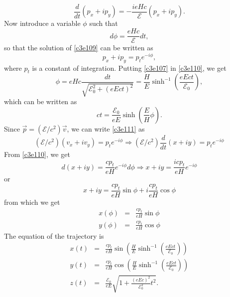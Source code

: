 \begin{enumerate}
\begin{equation}
\frac{d}{dt}(p_x + ip_y) = -\frac{ieHc}{\mathcal{E}}(p_x + ip_y).
\end{equation}
Now introduce a variable $\phi$ such that
\begin{equation}\label{c3e111}
d\phi = \frac{eHc}{\mathcal{E}}dt,
\end{equation}
so that the solution of \eqref{c3e109} can be written as
\begin{equation}\label{c3e112}
p_x + ip_y = p_t e^{-i\phi},
\end{equation}
where $p_t$ is a constant of integration. Putting \eqref{c3e107} in 
\eqref{c3e110}, we get
\begin{equation}\label{c3e113}
\phi = eHc\frac{dt}{\sqrt{\mathcal{E}_0^2 + (eEct)^2}} = \frac{H}{E}\sinh^{-1}
\left(\frac{eEct}{\mathcal{E}_0}\right),
\end{equation}
which can be written as
\begin{equation}\label{c3e114}
ct = \frac{\mathcal{E}_0}{eE}\sinh\left(\frac{E}{H}\phi\right).
\end{equation}
Since $\vec{p} = (\mathcal{E}/c^2)\vec{v}$, we can write \eqref{c3e111} as
\[
(\mathcal{E}/c^2)(v_x + iv_y) = p_t e^{-i\phi} \Rightarrow 
(\mathcal{E}/c^2)\frac{d}{dt}(x + iy) = p_te^{-i\phi}
\]
From \eqref{c3e110}, we get
\[
d(x + iy) = \frac{cp_t}{eH}e^{-i\phi}d\phi \Rightarrow x + iy = 
\frac{icp_t}{eH}e^{-i\phi}
\]
or
\[
x + iy = \frac{cp_t}{eH}\sin\phi + i\frac{cp_t}{eH}\cos\phi
\]
from which we get
\begin{eqnarray}
x(\phi) &=& \frac{cp_t}{eH}\sin\phi \label{c3e115} \\
y(\phi) &=& \frac{cp_t}{eH}\cos\phi \label{c3e116}
\end{eqnarray}
The equation of the trajectory is
\begin{eqnarray}
x(t) &=& 
\frac{cp_t}{eH}\sin\left(
\frac{H}{E}\sinh^{-1}\left(\frac{eEct}{\mathcal{E}_0}\right)\right) 
\label{c3e117} \\
y(t) &=& \frac{cp_t}{eH}\cos\left(
\frac{H}{E}\sinh^{-1}\left(\frac{eEct}{\mathcal{E}_0}\right)\right) 
\label{c3e118} \\
z(t) &=& \frac{\mathcal{E}_0}{eE}\sqrt{1 + \frac{(eEc)^2}
{\mathcal{E}_0^2}t^2}. \label{c3e119}
\end{eqnarray}
\end{enumerate}

